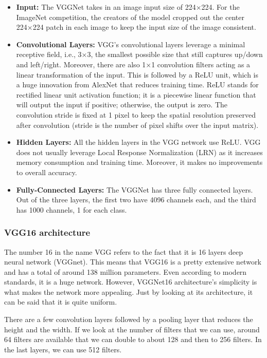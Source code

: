 \begin{itemize}
    \item \textbf{Input:} The VGGNet takes in an image input size of 224×224. For the ImageNet competition, the creators of the model cropped out the center 224×224 patch in each image to keep the input size of the image consistent.
    \item \textbf{Convolutional Layers:} VGG’s convolutional layers leverage a minimal receptive field, i.e., 3×3, the smallest possible size that still captures up/down and left/right. Moreover, there are also 1×1 convolution filters acting as a linear transformation of the input. This is followed by a ReLU unit, which is a huge innovation from AlexNet that reduces training time. ReLU stands for rectified linear unit activation function; it is a piecewise linear function that will output the input if positive; otherwise, the output is zero. The convolution stride is fixed at 1 pixel to keep the spatial resolution preserved after convolution (stride is the number of pixel shifts over the input matrix).
    \item \textbf{Hidden Layers:} All the hidden layers in the VGG network use ReLU. VGG does not usually leverage Local Response Normalization (LRN) as it increases memory consumption and training time. Moreover, it makes no improvements to overall accuracy.
    \item \textbf{Fully-Connected Layers:} The VGGNet has three fully connected layers. Out of the three layers, the first two have 4096 channels each, and the third has 1000 channels, 1 for each class.
\end{itemize}

\subsubsection{VGG16 architecture}
The number 16 in the name VGG refers to the fact that it is 16 layers deep neural network (VGGnet). This means that VGG16 is a pretty extensive network and has a total of around 138 million parameters. Even according to modern standards, it is a huge network. However, VGGNet16 architecture’s simplicity is what makes the network more appealing. Just by looking at its architecture, it can be said that it is quite uniform.

There are a few convolution layers followed by a pooling layer that reduces the height and the width. If we look at the number of filters that we can use, around 64 filters are available that we can double to about 128 and then to 256 filters. In the last layers, we can use 512 filters.

